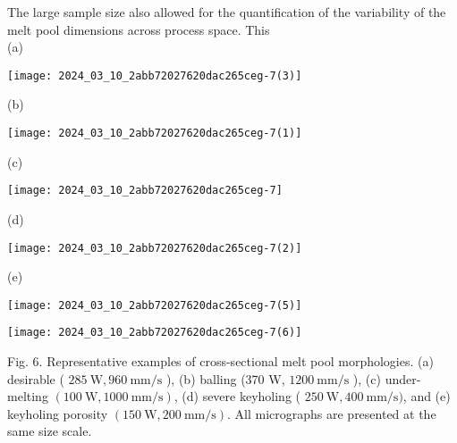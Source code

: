 \documentclass[10pt]{article}
\begin{document}
The large sample size also allowed for the quantification of the variability of the melt pool dimensions across process space. This\\
(a)

\begin{center}
\texttt{[image: 2024\_03\_10\_2abb72027620dac265ceg-7(3)]}
\end{center}

(b)

\begin{center}
\texttt{[image: 2024\_03\_10\_2abb72027620dac265ceg-7(1)]}
\end{center}

(c)

\begin{center}
\texttt{[image: 2024\_03\_10\_2abb72027620dac265ceg-7]}
\end{center}

(d)

\begin{center}
\texttt{[image: 2024\_03\_10\_2abb72027620dac265ceg-7(2)]}
\end{center}

(e)

\begin{center}
\texttt{[image: 2024\_03\_10\_2abb72027620dac265ceg-7(5)]}
\end{center}

\begin{center}
\texttt{[image: 2024\_03\_10\_2abb72027620dac265ceg-7(6)]}
\end{center}

Fig. 6. Representative examples of cross-sectional melt pool morphologies. (a) desirable ( $285 \mathrm{~W}, 960 \mathrm{~mm} / \mathrm{s}$ ), (b) balling (370 W, $1200 \mathrm{~mm} / \mathrm{s}$ ), (c) under-melting $(100 \mathrm{~W}, 1000 \mathrm{~mm} / \mathrm{s})$, (d) severe keyholing ( $250 \mathrm{~W}, 400 \mathrm{~mm} / \mathrm{s})$, and (e) keyholing porosity $(150 \mathrm{~W}, 200 \mathrm{~mm} / \mathrm{s})$. All micrographs are presented at the same size scale.
\end{document}
